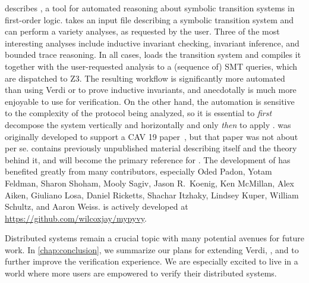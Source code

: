  describes \mypyvy,
  a tool for automated reasoning
  about symbolic transition systems in first-order logic.
\mypyvy takes an input file
  describing a symbolic transition system
  and can perform a variety analyses, as requested by the user.
Three of the most interesting analyses include
  inductive invariant checking,
  invariant inference, and
  bounded trace reasoning.
In all cases, \mypyvy loads the transition system
  and compiles it together with the user-requested analysis
  to a (sequence of) SMT queries,
  which are dispatched to Z3.
The resulting workflow is significantly more automated than using Verdi or \disel
  to prove inductive invariants, and anecdotally is much more enjoyable to use for verification.
On the other hand, the automation is sensitive to the complexity of the protocol being analyzed,
  so it is essential to \emph{first} decompose the system vertically and horizontally
  and only \emph{then} to apply \mypyvy.
\mypyvy was originally developed to support a CAV 19 paper~\cite{phase-updr},
  but that paper was not about \mypyvy per se.
 contains previously unpublished material describing \mypyvy itself
  and the theory behind it,
  and will become the primary reference for \mypyvy.
The development of \mypyvy has benefited greatly from many contributors,
  especially Oded Padon, Yotam Feldman, Sharon Shoham, Mooly Sagiv, Jason R.\ Koenig,
  Ken McMillan, Alex Aiken, Giuliano Losa,
  Daniel Ricketts, Shachar Itzhaky, Lindsey Kuper, William Schultz, and Aaron Weiss.
\mypyvy is actively developed at \url{https://github.com/wilcoxjay/mypyvy}.

Distributed systems remain a crucial topic
  with many potential avenues for future work.
In \cref{chap:conclusion},
  we summarize our plans
  for extending Verdi, \disel, and \mypyvy
  to further improve the verification experience.
We are especially excited
  to live in a world where more users
  are empowered to verify their distributed systems.